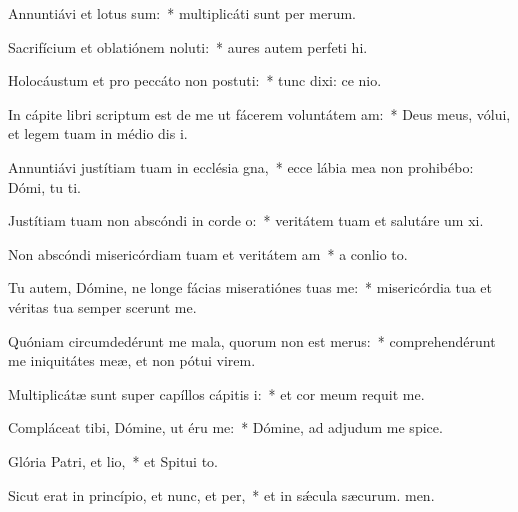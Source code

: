 \item Annuntiávi et lotus sum:~* multiplicáti sunt per merum.
\item Sacrifícium et oblatiónem noluti:~* aures autem perfeti hi.
\item Holocáustum et pro peccáto non postuti:~* tunc dixi: ce nio.
\item In cápite libri scriptum est de me ut fácerem voluntátem am:~* Deus meus, vólui, et legem tuam in médio dis i.
\item Annuntiávi justítiam tuam in ecclésia gna,~* ecce lábia mea non prohibébo: Dómi, tu ti.
\item Justítiam tuam non abscóndi in corde o:~* veritátem tuam et salutáre um xi.
\item Non abscóndi misericórdiam tuam et veritátem am~* a conlio to.
\item Tu autem, Dómine, ne longe fácias miseratiónes tuas  me:~* misericórdia tua et véritas tua semper scerunt me.
\item Quóniam circumdedérunt me mala, quorum non est merus:~* comprehendérunt me iniquitátes meæ, et non pótui  virem.
\item Multiplicátæ sunt super capíllos cápitis i:~* et cor meum requit me.
\item Compláceat tibi, Dómine, ut éru me:~* Dómine, ad adjudum me spice.
\item Glória Patri, et lio,~* et Spitui to.
\item Sicut erat in princípio, et nunc, et per,~* et in sǽcula sæcurum. men.
